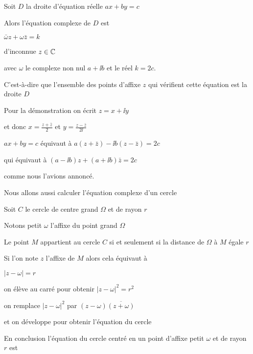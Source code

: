 Soit $D$ la droite d'équation réelle $ax+by=c$

\change

Alors l'équation complexe de $D$ est 

$\bar \omega z + \omega \bar z = k$

d'inconnue $z\in \mathbb{C}$

avec $\omega$ le complexe non nul $a+\ii b$ et le réel $k=2c$.

C'est-à-dire que l'ensemble des points d'affixe $z$ qui vérifient cette
équation est la droite $D$

\change

Pour la démonstration on écrit $z=x+\ii y$

\change


et donc $x = \frac{z+\bar z}{2}$ et $y = \frac{z - \bar z}{2 \ii }$

\change

$ax+by=c$ équivaut à $a(z+\bar z) -\ii  b(z-\bar z)=2c$

\change


qui équivaut à $(a-\ii  b)z+(a+\ii  b)\bar z = 2c$

comme nous l'avions annoncé.

\diapo


Nous allons aussi calculer l'équation complexe d'un cercle

Soit $C$ le cercle de centre grand $\Omega$ et de rayon $r$

Notons petit $\omega$ l'affixe du point grand $\Omega$

\change

Le point $M$ appartient au cercle $C$
si et seulement si la distance de $\Omega$ à $M$ égale $r$

\change

Si l'on note $z$ l'affixe de $M$ alors cela équivaut à

$|z-\omega|=r$

on élève au carré pour obtenir $|z-\omega|^2=r^2$

\change

on remplace $|z-\omega|^2$ par $(z-\omega)\overline{(z+\omega)}$

\change

et on développe pour obtenir l'équation du cercle

\change

En conclusion l'équation du cercle centré en un point d'affixe
petit $\omega$ et de rayon $r$ est 

